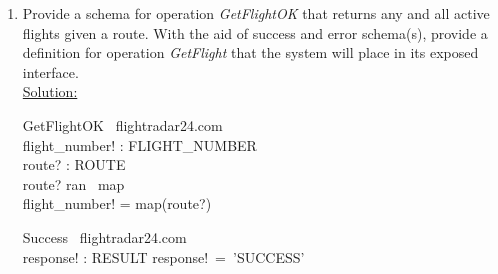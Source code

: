 \documentclass[12pt]{article}
\begin{document}
\begin{enumerate}
\begin{schema}{GetRouteOK}
\Xi \ flightradar24.com\\
flight\_number? : FLIGHT\_NUMBER \\
route! : ROUTE\\
\where
flight\_number? \in active\\
route! = map(flight\_number?)
\end{schema}

\begin{schema}{Success}
\Xi \ flightradar24.com\\
response! : RESULT
\where
response!~=~'SUCCESS'\\
\end{schema}

\begin{schema}{RouteNotFound}
\Xi \ flightradar24.com\\
flight\_number? : FLIGHT\_NUMBER\\
response! : RESULT
\ST
flight\_number? \notin active\\
route? \notin map \\
response!~=~'Since~flight\_number?~is~not~active~, unable~to~find~route'
\end{schema}


\[ GetRoute~\hat{=}~\\
~~~(GetRouteOK \wedge Success) \oplus RouteNotFound \]




\item Provide a schema for operation \emph{GetFlightOK} that returns any and all active
flights given a route. With the aid of success and error schema(s), provide a definition
for operation \emph{GetFlight} that the system will place in its exposed interface. \\
\noindent \underline{Solution:}\\


\begin{schema}{GetFlightOK}
\Xi \ flightradar24.com\\
flight\_number! : FLIGHT\_NUMBER \\
route? : ROUTE\\
\where
route? \in ran \ map \\
flight\_number! = map(route?) \\
\end{schema}

\begin{schema}{Success}
\Xi \ flightradar24.com\\
response! : RESULT
\where
response!~=~'SUCCESS'\\
\end{schema}


\end{enumerate}
\end{document}
